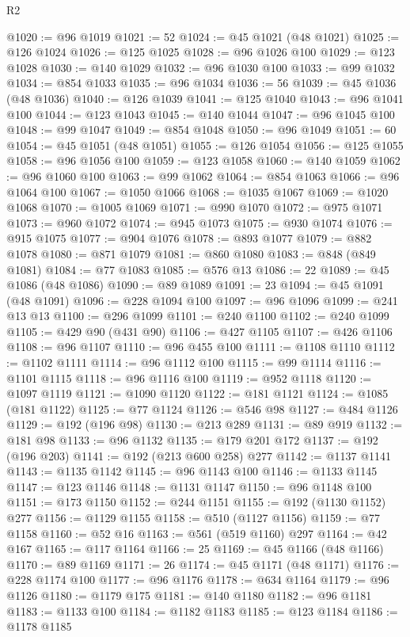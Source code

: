 \begin{lexlean}{R2}
\begin{coremodule}
@1020 := @96 @1019
@1021 := 52
@1024 := @45 @1021 (@48 @1021)
@1025 := @126 @1024
@1026 := @125 @1025
@1028 := @96 @1026 @100
@1029 := @123 @1028
@1030 := @140 @1029
@1032 := @96 @1030 @100
@1033 := @99 @1032
@1034 := @854 @1033
@1035 := @96 @1034
@1036 := 56
@1039 := @45 @1036 (@48 @1036)
@1040 := @126 @1039
@1041 := @125 @1040
@1043 := @96 @1041 @100
@1044 := @123 @1043
@1045 := @140 @1044
@1047 := @96 @1045 @100
@1048 := @99 @1047
@1049 := @854 @1048
@1050 := @96 @1049
@1051 := 60
@1054 := @45 @1051 (@48 @1051)
@1055 := @126 @1054
@1056 := @125 @1055
@1058 := @96 @1056 @100
@1059 := @123 @1058
@1060 := @140 @1059
@1062 := @96 @1060 @100
@1063 := @99 @1062
@1064 := @854 @1063
@1066 := @96 @1064 @100
@1067 := @1050 @1066
@1068 := @1035 @1067
@1069 := @1020 @1068
@1070 := @1005 @1069
@1071 := @990 @1070
@1072 := @975 @1071
@1073 := @960 @1072
@1074 := @945 @1073
@1075 := @930 @1074
@1076 := @915 @1075
@1077 := @904 @1076
@1078 := @893 @1077
@1079 := @882 @1078
@1080 := @871 @1079
@1081 := @860 @1080
@1083 := @848 (@849 @1081)
@1084 := @77 @1083
@1085 := @576 @13
@1086 := 22
@1089 := @45 @1086 (@48 @1086)
@1090 := @89 @1089
@1091 := 23
@1094 := @45 @1091 (@48 @1091)
@1096 := @228 @1094 @100
@1097 := @96 @1096
@1099 := @241 @13 @13
@1100 := @296 @1099
@1101 := @240 @1100
@1102 := @240 @1099
@1105 := @429 @90 (@431 @90)
@1106 := @427 @1105
@1107 := @426 @1106
@1108 := @96 @1107
@1110 := @96 @455 @100
@1111 := @1108 @1110
@1112 := @1102 @1111
@1114 := @96 @1112 @100
@1115 := @99 @1114
@1116 := @1101 @1115
@1118 := @96 @1116 @100
@1119 := @952 @1118
@1120 := @1097 @1119
@1121 := @1090 @1120
@1122 := @181 @1121
@1124 := @1085 (@181 @1122)
@1125 := @77 @1124
@1126 := @546 @98
@1127 := @484 @1126
@1129 := @192 (@196 @98)
@1130 := @213 @289
@1131 := @89 @919
@1132 := @181 @98
@1133 := @96 @1132
@1135 := @179 @201 @172
@1137 := @192 (@196 @203)
@1141 := @192 (@213 @600 @258) @277
@1142 := @1137 @1141
@1143 := @1135 @1142
@1145 := @96 @1143 @100
@1146 := @1133 @1145
@1147 := @123 @1146
@1148 := @1131 @1147
@1150 := @96 @1148 @100
@1151 := @173 @1150
@1152 := @244 @1151
@1155 := @192 (@1130 @1152) @277
@1156 := @1129 @1155
@1158 := @510 (@1127 @1156)
@1159 := @77 @1158
@1160 := @52 @16
@1163 := @561 (@519 @1160) @297
@1164 := @42 @167
@1165 := @117 @1164
@1166 := 25
@1169 := @45 @1166 (@48 @1166)
@1170 := @89 @1169
@1171 := 26
@1174 := @45 @1171 (@48 @1171)
@1176 := @228 @1174 @100
@1177 := @96 @1176
@1178 := @634 @1164
@1179 := @96 @1126
@1180 := @1179 @175
@1181 := @140 @1180
@1182 := @96 @1181
@1183 := @1133 @100
@1184 := @1182 @1183
@1185 := @123 @1184
@1186 := @1178 @1185

\end{coremodule}
\end{lexlean}
